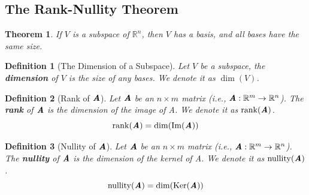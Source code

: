 \documentclass[12pt, a4paper]{article}
\newtheorem{thm}{Theorem}[subsection]
\newtheorem{df}{Definition}[subsection]
\def\R{{\mathbb{R}}}
\def\IM{{\mathrm{Im}}}
\def\Ker{\mathrm{Ker}}
\def\rank{\mathrm{rank}}
\def\nullity{\mathrm{nullity}}
\def\matrixA{\textbf{\emph{A}}}
\begin{document}
\subsection{The Rank-Nullity Theorem}
\begin{thm} 
	If $V$ is a subspace of $\R^n$, then $V$ has a basis, and all bases have the same size. 
\end{thm}
\begin{df}[The Dimension of a Subspace]
	Let $V$ be a subspace, the \textbf{dimension} of $V$ is the size of any bases. We denote it as $\dim(V)$. 
\end{df}
\begin{df}[Rank of $\matrixA$]
	Let $\matrixA$ be an $n\times m$ matrix (i.e., $\matrixA:\R^m\to\R^n$). The \textbf{rank} of $\matrixA$ is the dimension of the image of A. We denote it as $\rank(\matrixA)$. \[\rank(\matrixA)=\dim(\IM(\matrixA))\]
\end{df}
\begin{df}[Nullity of $\matrixA$]
	Let $\matrixA$ be an $n\times m$ matrix (i.e., $\matrixA:\R^m\to\R^n$). The \textbf{nullity} of $\matrixA$ is the dimension of the kernel of A. We denote it as $\nullity(\matrixA)$. \[\nullity(\matrixA)=\dim(\Ker(\matrixA))\]
\end{df}
\end{document}
